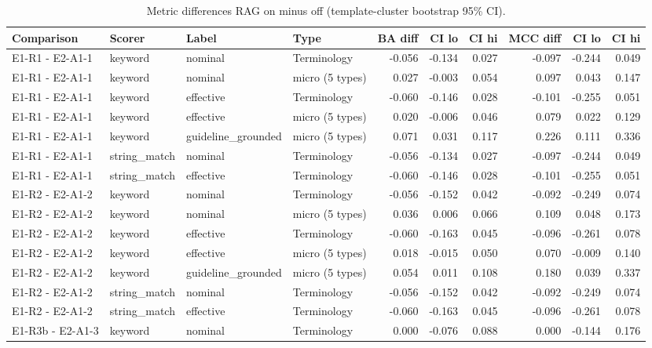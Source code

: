 \begin{table}[t]
\centering
\small
\caption{Metric differences RAG on minus off (template-cluster bootstrap 95\% CI).}
\label{tab:e7-diffs}
\begin{tabular}{llllrrrrrr}
\toprule
Comparison & Scorer & Label & Type & BA diff & CI lo & CI hi & MCC diff & CI lo  & CI hi  \\
\midrule
E1-R1 - E2-A1-1 & keyword & nominal & Terminology & -0.056 & -0.134 & 0.027 & -0.097 & -0.244 & 0.049 \\
E1-R1 - E2-A1-1 & keyword & nominal & micro (5 types) & 0.027 & -0.003 & 0.054 & 0.097 & 0.043 & 0.147 \\
E1-R1 - E2-A1-1 & keyword & effective & Terminology & -0.060 & -0.146 & 0.028 & -0.101 & -0.255 & 0.051 \\
E1-R1 - E2-A1-1 & keyword & effective & micro (5 types) & 0.020 & -0.006 & 0.046 & 0.079 & 0.022 & 0.129 \\
E1-R1 - E2-A1-1 & keyword & guideline\_grounded & micro (5 types) & 0.071 & 0.031 & 0.117 & 0.226 & 0.111 & 0.336 \\
E1-R1 - E2-A1-1 & string\_match & nominal & Terminology & -0.056 & -0.134 & 0.027 & -0.097 & -0.244 & 0.049 \\
E1-R1 - E2-A1-1 & string\_match & effective & Terminology & -0.060 & -0.146 & 0.028 & -0.101 & -0.255 & 0.051 \\
E1-R2 - E2-A1-2 & keyword & nominal & Terminology & -0.056 & -0.152 & 0.042 & -0.092 & -0.249 & 0.074 \\
E1-R2 - E2-A1-2 & keyword & nominal & micro (5 types) & 0.036 & 0.006 & 0.066 & 0.109 & 0.048 & 0.173 \\
E1-R2 - E2-A1-2 & keyword & effective & Terminology & -0.060 & -0.163 & 0.045 & -0.096 & -0.261 & 0.078 \\
E1-R2 - E2-A1-2 & keyword & effective & micro (5 types) & 0.018 & -0.015 & 0.050 & 0.070 & -0.009 & 0.140 \\
E1-R2 - E2-A1-2 & keyword & guideline\_grounded & micro (5 types) & 0.054 & 0.011 & 0.108 & 0.180 & 0.039 & 0.337 \\
E1-R2 - E2-A1-2 & string\_match & nominal & Terminology & -0.056 & -0.152 & 0.042 & -0.092 & -0.249 & 0.074 \\
E1-R2 - E2-A1-2 & string\_match & effective & Terminology & -0.060 & -0.163 & 0.045 & -0.096 & -0.261 & 0.078 \\
E1-R3b - E2-A1-3 & keyword & nominal & Terminology & 0.000 & -0.076 & 0.088 & 0.000 & -0.144 & 0.176 \\

\end{tabular}
\end{table}

